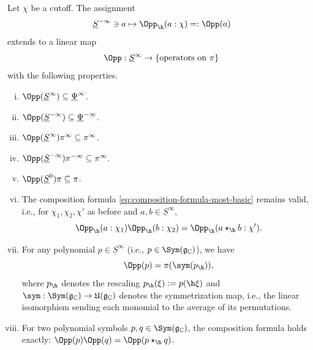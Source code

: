 \begin{theorem}\label{thm:qualitative-extended-operator-assignment}
  Let $\chi$ be a cutoff.  The assignment
  \begin{equation*}
    \underline{S}^{-\infty} \ni a \mapsto \Opp_{\h}(a:\chi) =: \Opp(a)
  \end{equation*}
  extends to a linear map
  \begin{equation*}
    \Opp : \underline{S}^{\infty} \rightarrow
    \{\text{operators on } \pi\}
  \end{equation*}
  with the following properties.
  \begin{enumerate}[(i)]
  \item $\Opp(\underline{S}^\infty) \subseteq \underline{\Psi}^{\infty}$.
  \item $\Opp(\underline{S}^{-\infty}) \subseteq \underline{\Psi}^{-\infty}$.
  \item $\Opp(\underline{S}^{\infty}) \pi^\infty \subseteq \pi^\infty$.
  \item\label{enumerate:cuhmv6fu1d} $\Opp(\underline{S}^{-\infty}) \pi^{-\infty} \subseteq \pi^\infty$.
  \item\label{enumerate:cuhmv6fwiz} $\Opp (\underline{S}^0) \pi \subseteq \pi$.
  \item The composition formula \eqref{eq:composition-formula-most-basic} remains valid, i.e., for $\chi_1, \chi_2, \chi '$ as before and $a, b \in \underline{S}^{\infty}$,
    \begin{equation}\label{eq:qualitative-composition-formula}
      \Opp_{\h}(a:\chi_1)
      \Opp_{\h}(b:\chi_2)
      =
      \Opp_{\h}(a \star_{\h} b:\chi').
    \end{equation}
  \item\label{enumerate:cui1f04tkm} For any polynomial $p \in \underline{S}^\infty$ (i.e., $p \in \Sym(\mathfrak{g}_{\mathbb{C}})$), we have
    \begin{equation}\label{eq:oppp-=-pisymp_h}
      \Opp(p) = \pi(\sym(p_{\h})),
    \end{equation}
    where $p_{\h}$ denotes the rescaling $p_{\h}(\xi) := p(\h \xi)$ and $\sym : \Sym(\mathfrak{g}_\mathbb{C}) \rightarrow \mathfrak{U}(\mathfrak{g}_\mathbb{C})$ denotes the symmetrization map, i.e., the linear isomorphism sending each monomial to the average of its permutations.
  \item\label{enumerate:cui1f0676u} For two polynomial symbols $p, q \in \Sym(\mathfrak{g}_{\mathbb{C}})$, the composition formula holds exactly: $\Opp(p) \Opp(q) = \Opp(p \star_{\h} q)$.
  \end{enumerate}
\end{theorem}
